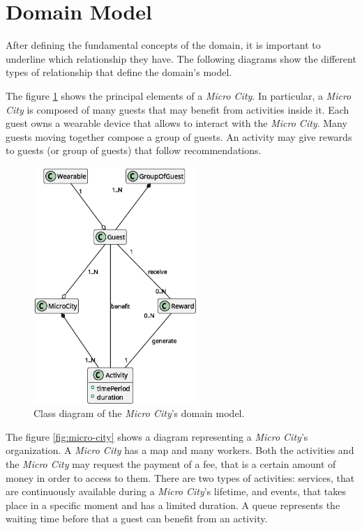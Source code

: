 \section{Domain Model}
\label{sec:model}

After defining the fundamental concepts of the domain, it is important to underline which relationship they have. The following diagrams show the different types of relationship that define the domain's model.

The figure \ref{fig:domain-overview} shows the principal elements of a \textit{Micro City}. In particular, a \textit{Micro City} is composed of many guests that may benefit from activities inside it. Each guest owns a wearable device that allows to interact with the \textit{Micro City}. Many guests moving together compose a group of guests. An activity may give rewards to guests (or group of guests) that follow recommendations.

\begin{figure}[H]
    \centering
    \includegraphics[width=0.55\textwidth]{./img/domain_overview-0}
    \caption{Class diagram of the \textit{Micro City}'s domain model.}
    \label{fig:domain-overview}
\end{figure}

\newpage

The figure \ref{fig:micro-city} shows a diagram representing a \textit{Micro City}'s organization. A \textit{Micro City} has a map and many workers. Both the activities and the \textit{Micro City} may request the payment of a fee, that is a certain amount of money in order to access to them. There are two types of activities: services, that are continuously available during a \textit{Micro City}'s lifetime, and events, that takes place in a specific moment and has a limited duration. A queue represents the waiting time before that a guest can benefit from an activity.

